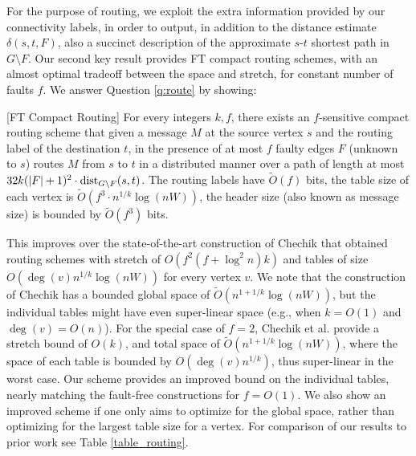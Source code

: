 For the purpose of routing, we exploit the extra information provided by our connectivity labels, in order to output, in addition to the distance estimate $\delta(s,t,F)$, also a succinct description of the approximate $s$-$t$ 
shortest path in $G \setminus F$. Our second key result provides FT compact routing schemes, with an almost optimal tradeoff between the space and stretch, for constant number of faults $f$. We answer Question \ref{q:route} by showing:

\begin{theorem}\label{thm:routing}[FT Compact Routing]
For every integers $k,f$, there exists an $f$-sensitive compact routing scheme that given a message $M$ at the source vertex $s$ and the routing label of the destination $t$, in the presence of at most $f$ faulty edges $F$ (unknown to $s$) routes $M$ from $s$ to $t$ in a distributed manner over a path of length at most $32k (|F|+1)^2\cdot \mbox{\rm dist}_{G \setminus F}(s,t)$. The routing labels have $\widetilde{O}(f)$ bits, the table size of each vertex is $\widetilde{O}(f^3 \cdot n^{1/k} \log(nW))$, the header size (also known as message size) is bounded by $\widetilde{O}(f^3)$ bits. 
\end{theorem}
This improves over the state-of-the-art construction of Chechik \cite{chechik2011fault} that 
obtained routing schemes with stretch of $O(f^2(f+\log^2 n)k)$ and tables of size $O(\deg(v)n^{1/k}\log{(nW)})$ for every vertex $v$. We note that the construction of Chechik \cite{chechik2011fault} has a bounded global space of $\widetilde{O}(n^{1+1/k} \log{(nW)})$, but the individual tables might have even super-linear space (e.g., when $k=O(1)$ and $\deg(v)=O(n)$).  For the special case of $f=2$, Chechik et al. \cite{ChechikLPR10,chechik2012f} provide a stretch bound of $O(k)$, and total space of $\widetilde{O}(n^{1+1/k} \log{(nW)})$, where the space of each table is bounded by $O(\deg(v)n^{1/k})$, thus super-linear in the worst case. Our scheme provides an improved bound on the individual tables, nearly matching the fault-free constructions for $f=O(1)$. We also show an improved scheme if one only aims to optimize for the global space, rather than optimizing for the largest table size for a vertex. For comparison of our results to prior work see Table \ref{table_routing}. %

